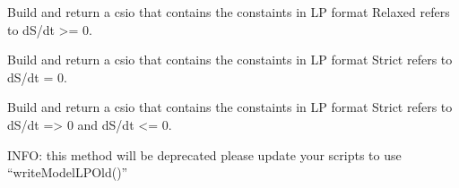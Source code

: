 \documentclass[letterpaper,12pt,english]{sphinxmanual}
\begin{document}
\begin{fulllineitems}

\pysigstartsignatures
\pysiglinewithargsret
{}
{}
{}
\pysigstopsignatures
\sphinxAtStartPar
Build and return a csio that contains the constaints in LP format Relaxed refers
to dS/dt \textgreater{}= 0.

\end{fulllineitems}



\begin{fulllineitems}

\pysigstartsignatures
\pysiglinewithargsret
{}
{\sphinxparamcomma {}}
{}
\pysigstopsignatures
\sphinxAtStartPar
Build and return a csio that contains the constaints in LP format Strict refers
to dS/dt = 0.

\end{fulllineitems}



\begin{fulllineitems}

\pysigstartsignatures
\pysiglinewithargsret
{}
{\sphinxparamcomma {}}
{}
\pysigstopsignatures
\sphinxAtStartPar
Build and return a csio that contains the constaints in LP format Strict refers
to dS/dt =\textgreater{} 0 and dS/dt \textless{}= 0.

\end{fulllineitems}



\begin{fulllineitems}

\pysigstartsignatures
\pysiglinewithargsret
{}
{\sphinxparamcomma {}\sphinxparamcomma {}\sphinxparamcomma {}\sphinxparamcomma {}\sphinxparamcomma {}\sphinxparamcomma {}}
{}
\pysigstopsignatures
\sphinxAtStartPar
INFO: this method will be deprecated please update your scripts to use “writeModelLPOld()”

\end{fulllineitems}
\end{document}
